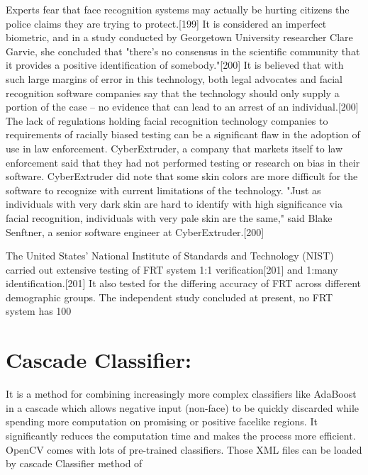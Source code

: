Experts fear that face recognition systems may actually be hurting citizens the police claims they are trying to protect.[199] It is considered an imperfect biometric, and in a study conducted by Georgetown University researcher Clare Garvie, she concluded that "there's no consensus in the scientific community that it provides a positive identification of somebody."[200] It is believed that with such large margins of error in this technology, both legal advocates and facial recognition software companies say that the technology should only supply a portion of the case – no evidence that can lead to an arrest of an individual.[200] The lack of regulations holding facial recognition technology companies to requirements of racially biased testing can be a significant flaw in the adoption of use in law enforcement. CyberExtruder, a company that markets itself to law enforcement said that they had not performed testing or research on bias in their software. CyberExtruder did note that some skin colors are more difficult for the software to recognize with current limitations of the technology. "Just as individuals with very dark skin are hard to identify with high significance via facial recognition, individuals with very pale skin are the same," said Blake Senftner, a senior software engineer at CyberExtruder.[200]

The United States' National Institute of Standards and Technology (NIST) carried out extensive testing of FRT system 1:1 verification[201] and 1:many identification.[201] It also tested for the differing accuracy of FRT across different demographic groups. The independent study concluded at present, no FRT system has 100%

\newpage
\section{Cascade Classifier:}
It is a method for combining increasingly more complex classifiers like AdaBoost in a cascade which allows
negative input (non-face) to be quickly discarded while spending more computation on promising or positive facelike regions. It significantly reduces the computation time and makes the process more efficient.
OpenCV comes with lots of pre-trained classifiers. Those XML files can be loaded by cascade Classifier method of



